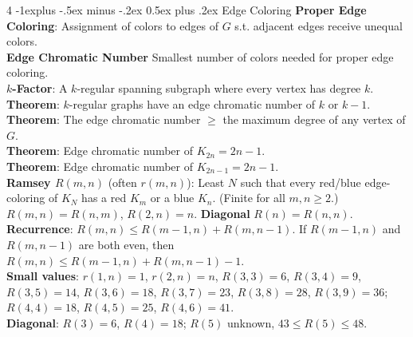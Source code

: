 \documentclass[letterpaper, 8pt]{extarticle}
\makeatletter
\renewcommand{\section}{\@startsection{section}{1}{0mm}%
	{-1explus -.5ex minus -.2ex}%
	{0.5ex plus .2ex}%
	{\normalfont\normalsize\bfseries}}
\makeatother
\begin{document}
\begin{multicols*}{4}
	\section{Edge Coloring}
	\textbf{Proper Edge Coloring}: Assignment of colors to edges of $G$ s.t. adjacent edges receive unequal colors. \\
	\textbf{Edge Chromatic Number} Smallest number of colors needed for proper edge coloring. \\
	\textbf{$k$-Factor}: A $k$-regular spanning subgraph where every vertex has degree $k$. \\
	\textbf{Theorem}: $k$-regular graphs have an edge chromatic number of $k$ or $k-1$. \\
	\textbf{Theorem}: The edge chromatic number $\ge$ the maximum degree of any vertex of $G$. \\
	\textbf{Theorem}: Edge chromatic number of $K_{2n} = 2n-1$. \\
	\textbf{Theorem}: Edge chromatic number of $K_{2n-1} = 2n-1$. \\
	\textbf{Ramsey $R(m,n)$} (often $r(m,n)$): Least $N$ such that every red/blue edge-coloring of $K_N$ has a red $K_m$ or a blue $K_n$. (Finite for all $m,n\ge 2$.) $R(m,n)=R(n,m)$, $R(2,n)=n$. \textbf{Diagonal} $R(n)=R(n,n)$. \\
	\textbf{Recurrence}: $R(m,n)\le R(m-1,n)+R(m,n-1)$. If $R(m-1,n)$ and $R(m,n-1)$ are both even, then $R(m,n)\le R(m-1,n)+R(m,n-1)-1$. \\
	\textbf{Small values}: $r(1,n) = 1$, $r(2,n) = n$, $R(3,3)=6$, $R(3,4)=9$, $R(3,5)=14$, $R(3,6)=18$, $R(3,7)=23$, $R(3,8)=28$, $R(3,9)=36$; $R(4,4)=18$, $R(4,5)=25$, $R(4,6)=41$. \\
	\textbf{Diagonal}: $R(3)=6$, $R(4)=18$; $R(5)$ unknown, $43\le R(5)\le 48$. \\


\end{multicols*}
\end{document}
